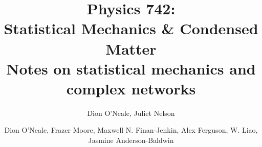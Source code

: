 \documentclass{article}
\begin{document}
\newcommand{\calG}{\mathcal{G}}
\title{Physics 742: \\
	Statistical Mechanics \& Condensed Matter\\
	Notes on statistical mechanics and complex networks}
\author{Dion O'Neale, Juliet Nelson}
\author{Dion O'Neale, Frazer Moore, Maxwell N. Finan-Jenkin, Alex Ferguson, W. Liao, Jasmine Anderson-Baldwin}

\maketitle
\newpage
\tableofcontents
\newpage












\end{document}
